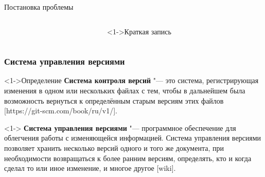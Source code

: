 \documentclass[pdf,9pt,aspectratio=169,xcolor={dvipsnames}]{beamer}
\begin{document}
\begin{frame}{Постановка проблемы}
\begin{columns}[T]
\begin{column}[]{0.65\textwidth}
\begin{exampleblock}
\begin{center}
        \end{center}
      \end{exampleblock}
    \end{column}
    \begin{column}[]{0.3\textwidth}  
      \begin{block}<1->{Краткая запись}
        \begin{center}
        \end{center}
      \end{block}
    \end{column}
  \end{columns}
\end{frame}

\begin{frame}\frametitle{Система управления версиями}
  \begin{block}<1->{Определение}
    \textbf{Система контроля версий} "---  это система, регистрирующая изменения в одном или нескольких файлах с тем, чтобы в дальнейшем была возможность вернуться к определённым старым версиям этих файлов [https://git-scm.com/book/ru/v1/]. 
  \end{block}
  \begin{block}<1->{}
    \textbf{Система управления версиями} "---   программное обеспечение для облегчения работы с изменяющейся информацией. Система управления версиями позволяет хранить несколько версий одного и того же документа, при необходимости возвращаться к более ранним версиям, определять, кто и когда сделал то или иное изменение, и многое другое [wiki]. 
  \end{block}
\end{frame}
\end{document}
